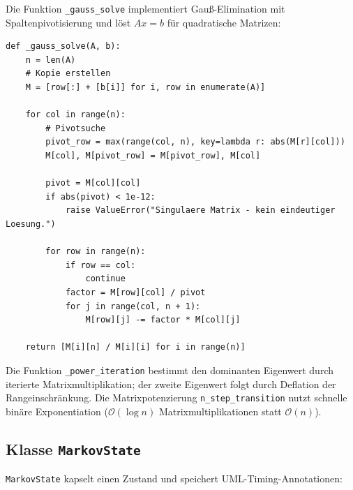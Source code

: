 ﻿\documentclass[a4paper,12pt]{report}
\theoremstyle{definition}
\begin{document}
Die Funktion \texttt{\_gauss\_solve} implementiert Gauß-Elimination mit
Spaltenpivotisierung und löst $Ax = b$ für quadratische Matrizen:

\begin{lstlisting}[style=python, caption={Gauß-Elimination mit Spaltenpivotisierung (Kernfunktion)}, label=lst:gauss]
def _gauss_solve(A, b):
    n = len(A)
    # Kopie erstellen
    M = [row[:] + [b[i]] for i, row in enumerate(A)]

    for col in range(n):
        # Pivotsuche
        pivot_row = max(range(col, n), key=lambda r: abs(M[r][col]))
        M[col], M[pivot_row] = M[pivot_row], M[col]

        pivot = M[col][col]
        if abs(pivot) < 1e-12:
            raise ValueError("Singulaere Matrix - kein eindeutiger Loesung.")

        for row in range(n):
            if row == col:
                continue
            factor = M[row][col] / pivot
            for j in range(col, n + 1):
                M[row][j] -= factor * M[col][j]

    return [M[i][n] / M[i][i] for i in range(n)]
\end{lstlisting}

Die Funktion \texttt{\_power\_iteration} bestimmt den dominanten Eigenwert
durch iterierte Matrixmultiplikation; der zweite Eigenwert folgt durch
Deflation der Rangeinschränkung. Die Matrixpotenzierung
\texttt{n\_step\_transition} nutzt schnelle binäre Exponentiation
($\mathcal{O}(\log n)$ Matrixmultiplikationen statt $\mathcal{O}(n)$).

\subsection{Klasse \texttt{MarkovState}}

\texttt{MarkovState} kapselt einen Zustand und speichert UML-Timing-Annotationen:
\end{document}
